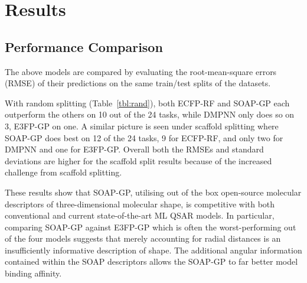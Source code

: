 
\section{Results}\label{sec:results} %
\subsection{Performance Comparison}
The above models are compared by evaluating the root-mean-square errors (RMSE) of their predictions on the same train/test splits of the datasets. 

With random splitting (Table~\ref{tbl:rand}), both ECFP-RF and SOAP-GP each outperform the others on 10 out of the 24 tasks, while DMPNN only does so on 3, E3FP-GP on one. A similar picture is seen under scaffold splitting where SOAP-GP does best on 12 of the 24 tasks, 9 for ECFP-RF, and only two for DMPNN and one for E3FP-GP. Overall both the RMSEs and standard deviations are higher for the scaffold split results because of the increased challenge from scaffold splitting.

These results show that SOAP-GP, utilising out of the box open-source molecular descriptors of three-dimensional molecular shape, is competitive with both conventional and current state-of-the-art ML QSAR models. In particular, comparing SOAP-GP against E3FP-GP which is often the worst-performing out of the four models suggests that merely accounting for radial distances is an insufficiently informative description of shape. The additional angular information contained within the SOAP descriptors allows the SOAP-GP to far better model binding affinity.

